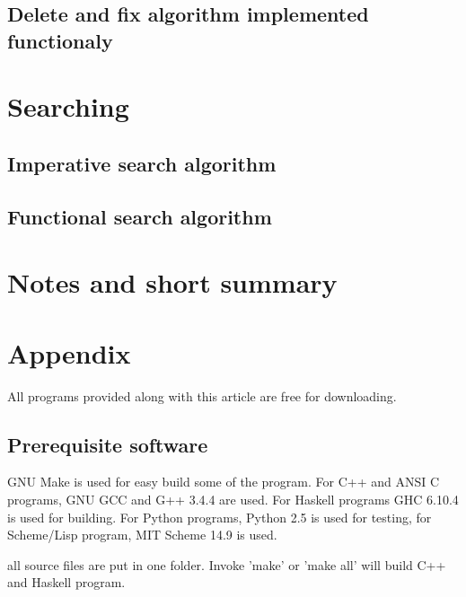 \documentclass{article}
\begin{document}
\subsection{Delete and fix algorithm implemented functionaly}

\section{Searching} 

\subsection{Imperative search algorithm}

\subsection{Functional search algorithm}

\section{Notes and short summary}


\section{Appendix} \label{appendix}
All programs provided along with this article are free for
downloading.

\subsection{Prerequisite software}
GNU Make is used for easy build some of the program. For C++ and ANSI C programs,
GNU GCC and G++ 3.4.4 are used. 
For Haskell programs GHC 6.10.4 is used
for building. For Python programs, Python 2.5 is used for testing, for
Scheme/Lisp program, MIT Scheme 14.9 is used.

all source files are put in one folder. Invoke 'make' or 'make all'
will build C++ and Haskell program. 
\end{document}
